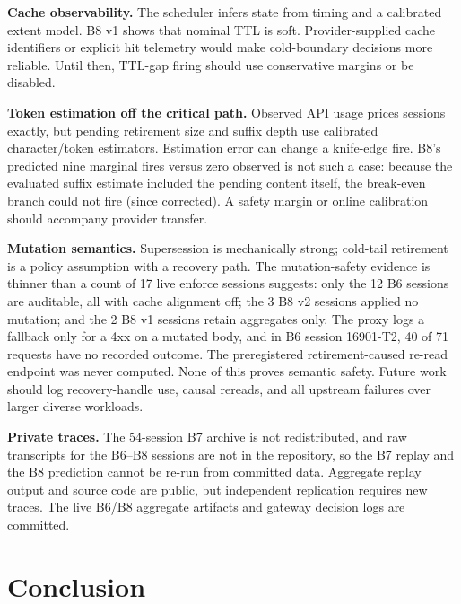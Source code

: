\documentclass[10pt,twocolumn]{article}
\begin{document}
\textbf{Cache observability.}  The scheduler infers state from timing and a calibrated extent model.
B8 v1 shows that nominal TTL is soft.  Provider-supplied cache identifiers or explicit hit telemetry
would make cold-boundary decisions more reliable.  Until then, TTL-gap firing should use conservative
margins or be disabled.

\textbf{Token estimation off the critical path.}  Observed API usage prices sessions exactly, but
pending retirement size and suffix depth use calibrated character/token estimators.  Estimation error
can change a knife-edge fire.  B8's predicted nine marginal fires versus zero observed is not such a
case: because the evaluated suffix estimate included the pending content itself, the break-even branch
could not fire (since corrected).  A safety margin or online calibration should accompany provider transfer.

\textbf{Mutation semantics.}  Supersession is mechanically strong; cold-tail retirement is a policy
assumption with a recovery path.  The mutation-safety evidence is thinner than a count of 17 live
enforce sessions suggests: only the 12 B6 sessions are auditable, all with cache alignment off; the 3
B8 v2 sessions applied no mutation; and the 2 B8 v1 sessions retain aggregates only.  The proxy logs a
fallback only for a 4xx on a mutated body, and in B6 session 16901-T2, 40 of 71 requests have no
recorded outcome.  The preregistered retirement-caused re-read endpoint was never computed.  None of
this proves semantic safety.  Future work should log recovery-handle use, causal rereads, and all
upstream failures over larger diverse workloads.

\textbf{Private traces.}  The 54-session B7 archive is not redistributed, and raw transcripts for the
B6--B8 sessions are not in the repository, so the B7 replay and the B8 prediction cannot be re-run from
committed data.  Aggregate replay output and source code are public, but independent replication
requires new traces.  The live B6/B8 aggregate artifacts and gateway decision logs are committed.

\section{Conclusion}
\end{document}
